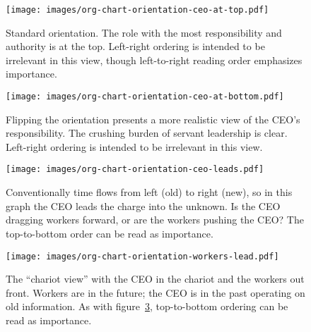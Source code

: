 \begin{figure}
\texttt{[image: images/org-chart-orientation-ceo-at-top.pdf]}
\caption{Standard orientation. The role with the most responsibility and authority is at the top. Left-right ordering is intended to be irrelevant in this view, though left-to-right reading order emphasizes importance.}
\label{fig:org_chart_orientation_ceo-at-top}
\end{figure}

\begin{figure}
\texttt{[image: images/org-chart-orientation-ceo-at-bottom.pdf]}
\caption{Flipping the orientation presents a more realistic view of the CEO's responsibility. The crushing burden of servant leadership is clear. Left-right ordering is intended to be irrelevant in this view.}
\label{fig:org_chart_orientation_ceo-at-bottom}
\end{figure}

\begin{figure}
\texttt{[image: images/org-chart-orientation-ceo-leads.pdf]}
\caption{Conventionally time flows from left (old) to right (new), so in this graph the CEO leads the charge into the unknown. Is the CEO dragging workers forward, or are the workers pushing the CEO? The top-to-bottom order can be read as importance. }
\label{fig:org_chart_orientation_ceo-leads}
\end{figure}

\begin{figure}
\texttt{[image: images/org-chart-orientation-workers-lead.pdf]}
\caption{The ``chariot view'' with the CEO in the chariot and the workers out front. Workers are in the future; the CEO is in the past operating on old information. As with figure~\ref{fig:org_chart_orientation_ceo-leads}, top-to-bottom ordering can be read as importance. }
\label{fig:org_chart_orientation_ceo-follows}
\end{figure}



